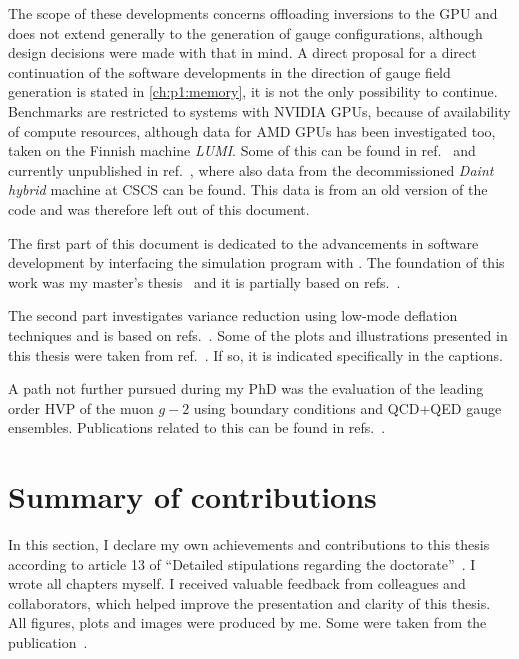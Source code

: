 The scope of these developments concerns offloading inversions to the GPU and does not extend generally to the generation of gauge configurations, although design decisions were made with that in mind.
A direct proposal for a direct continuation of the software developments in the direction of gauge field generation is stated in \cref{ch:p1:memory}, it is not the only possibility to continue.
Benchmarks are restricted to systems with NVIDIA GPUs, because of availability of compute resources, although data for AMD GPUs has been investigated too, taken on the Finnish machine \emph{LUMI}.
Some of this can be found in ref.~ and currently unpublished in ref.~, where also data from the decommissioned \emph{Daint hybrid} machine at CSCS can be found.
This data is from an old version of the code and was therefore left out of this document.

The first part of this document is dedicated to the advancements in software development by interfacing the simulation program \openqxd with \quda.
The foundation of this work was my master's thesis~ and it is partially based on refs.~.

The second part investigates variance reduction using low-mode deflation techniques and is based on refs.~.
Some of the plots and illustrations presented in this thesis were taken from ref.~.
If so, it is indicated specifically in the captions.

A path not further pursued during my PhD was the evaluation of the leading order HVP of the muon $g-2$ using \Cstar boundary conditions and QCD+QED gauge ensembles.
Publications related to this can be found in refs.~.



\section{Summary of contributions}

In this section, I declare my own achievements and contributions to this thesis according to article \num{13} of ``Detailed stipulations regarding the doctorate''~\cite{eth:doctorate:stipulations}.
I wrote all chapters myself.
I received valuable feedback from colleagues and collaborators, which helped improve the presentation and clarity of this thesis.
All figures, plots and images were produced by me.
Some were taken from the publication~\cite{mglma}.

